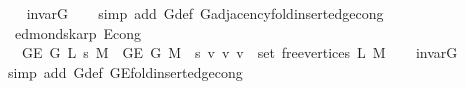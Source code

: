 \begin{isabellebody}
\endisataginvisible
{\isafoldinvisible}%
%
\isadeliminvisible
\isanewline
%
\endisadeliminvisible
%
\isadelimproof
\ \ %
\endisadelimproof
%
\isatagproof
{}\isamarkupfalse%
\ invar{\isacharunderscore}{\kern0pt}G{}{\isacharunderscore}{\kern0pt}{}\isanewline
\ \ \isamarkupfalse%
\ {\isacharparenleft}{\kern0pt}simp\ add{\isacharcolon}{\kern0pt}\ G{}{\isacharunderscore}{\kern0pt}{}{\isacharunderscore}{\kern0pt}def\ G{\isachardot}{\kern0pt}adjacency{\isacharunderscore}{\kern0pt}fold{\isacharunderscore}{\kern0pt}insert{\isacharunderscore}{\kern0pt}edge{\isacharunderscore}{\kern0pt}cong{\isacharparenright}{\kern0pt}%
\endisatagproof
{\isafoldproof}%
%
\isadelimproof
\isanewline
%
\endisadelimproof
\isanewline
{}\isamarkupfalse%
\ {\isacharparenleft}{\kern0pt}\ edmonds{\isacharunderscore}{\kern0pt}karp{\isacharparenright}{\kern0pt}\ E{}{\isacharunderscore}{\kern0pt}{}{\isacharunderscore}{\kern0pt}cong{\isacharcolon}{\kern0pt}\isanewline
\ \ \ {\isachardoublequoteopen}G{\isachardot}{\kern0pt}E\ {\isacharparenleft}{\kern0pt}G{}{\isacharunderscore}{\kern0pt}{}\ L\ s\ M{\isacharparenright}{\kern0pt}\ {\isacharequal}{\kern0pt}\ G{\isachardot}{\kern0pt}E\ {\isacharparenleft}{\kern0pt}G{}{\isacharunderscore}{\kern0pt}{}\ M{\isacharparenright}{\kern0pt}\ {\isasymunion}\ {\isacharbraceleft}{\kern0pt}{\isacharbraceleft}{\kern0pt}s{\isacharcomma}{\kern0pt}\ v{\isacharbraceright}{\kern0pt}\ {\isacharbar}{\kern0pt}v{\isachardot}{\kern0pt}\ v\ {\isasymin}\ set\ {\isacharparenleft}{\kern0pt}free{\isacharunderscore}{\kern0pt}vertices\ L\ M{\isacharparenright}{\kern0pt}{\isacharbraceright}{\kern0pt}{\isachardoublequoteclose}\isanewline
%
\isadelimproof
\ \ %
\endisadelimproof
%
\isatagproof
{}\isamarkupfalse%
\ invar{\isacharunderscore}{\kern0pt}G{}{\isacharunderscore}{\kern0pt}{}\isanewline
\ \ \isamarkupfalse%
\ {\isacharparenleft}{\kern0pt}simp\ add{\isacharcolon}{\kern0pt}\ G{}{\isacharunderscore}{\kern0pt}{}{\isacharunderscore}{\kern0pt}def\ G{\isachardot}{\kern0pt}E{\isacharunderscore}{\kern0pt}fold{\isacharunderscore}{\kern0pt}insert{\isacharunderscore}{\kern0pt}edge{\isacharunderscore}{\kern0pt}cong{\isacharparenright}{\kern0pt}%
\endisatagproof
{\isafoldproof}%
%
\isadelimproof
\isanewline
%
\endisadelimproof
%
\isadeliminvisible
\isanewline
%
\endisadeliminvisible
%
\isataginvisible
{}\isamarkupfalse%

\end{isabellebody}
